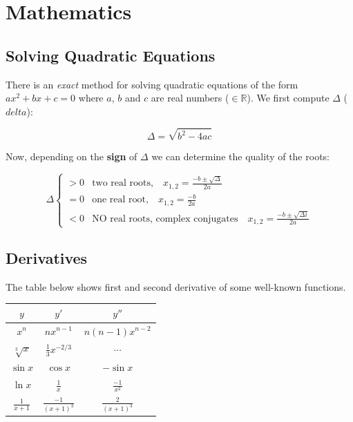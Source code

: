\documentclass[a4paper,11pt]{article}
\begin{document}
\section{Mathematics}
\subsection{Solving Quadratic Equations}
There is an \textit{exact} method for solving quadratic equations of the form $ax^2 + bx + c = 0$ where $a$, $b$ and $c$ are real numbers ($\in \mathbb{R}$). We first compute $\Delta$ ($delta$):

\begin{equation}
\Delta = \sqrt{b^2-4ac}
\end{equation}

Now, depending on the \textbf{sign} of $\Delta$ we can determine the quality of the roots:

\begin{equation*}
\Delta 
\begin{cases}

>0 & \textrm{two real roots,}  \quad x_{1,2}=\frac{-b \pm \sqrt{\Delta}}{2a}\\
=0 & \textrm{one real root,}  \quad x_{1,2}=\frac{-b}{2a} \\
<0 & \textrm{NO real roots, complex conjugates} \quad x_{1,2}=\frac{-b \pm \sqrt{\Delta i}}{2a}
\end{cases}
\end{equation*}
\subsection{Derivatives}
The table below shows first and second derivative of some well-known functions.

\begin{table}[h]
\centering
\begin{tabular}{|c|c|c|}
\hline
$y$&$y'$&$y''$\\
\hline
$x^n$ & $n x^{n-1}$ & $n (n-1) x^{n-2}$\\
$\sqrt[3]{x}$&$\frac{1}{3}x^{-2/3}$&$\cdots$\\
$\sin x$&$\cos x$&$- \sin x $\\
$\ln x$&$\frac{1}{x}$&$\frac{-1}{x^2}$\\
$\frac{1}{x+1}$&$\frac{-1}{{(x+1)}^3}$&$\frac{2}{{(x+1)}^3}$\\
\hline
\end{tabular}
\end{table}
\end{document}
